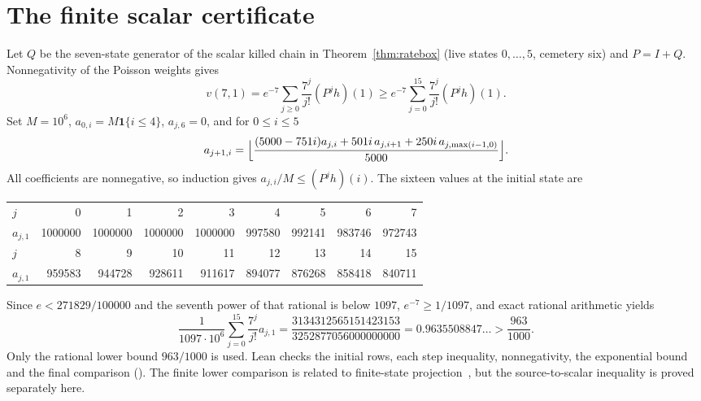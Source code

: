 \documentclass[11pt,a4paper]{article}
\theoremstyle{plain}
\theoremstyle{definition}
\theoremstyle{remark}
\newcommand{\ind}{\mathbf 1}
\begin{document}
\section{The finite scalar certificate}\label{app:scalar}
Let $Q$ be the seven-state generator of the scalar killed chain in Theorem~\ref{thm:ratebox} (live states $0,\dots,5$, cemetery six) and $P=I+Q$. Nonnegativity of the Poisson weights gives
\[
v(7,1)=e^{-7}\sum_{j\ge0}\frac{7^j}{j!}(P^jh)(1)\ge e^{-7}\sum_{j=0}^{15}\frac{7^j}{j!}(P^jh)(1).
\]
Set $M=10^6$, $a_{0,i}=M\ind\{i\le4\}$, $a_{j,6}=0$, and for $0\le i\le5$
\begin{equation}\label{eq:rows}
a_{j+1,i}=\Bigl\lfloor\frac{(5000-751i)a_{j,i}+501i\,a_{j,i+1}+250i\,a_{j,\max(i-1,0)}}{5000}\Bigr\rfloor .
\end{equation}
All coefficients are nonnegative, so induction gives $a_{j,i}/M\le(P^jh)(i)$. The sixteen values at the initial state are
\begin{center}\small
\begin{tabular}{@{}lrrrrrrrr@{}}
\toprule
$j$ & 0 & 1 & 2 & 3 & 4 & 5 & 6 & 7\\
$a_{j,1}$ & 1000000 & 1000000 & 1000000 & 1000000 & 997580 & 992141 & 983746 & 972743\\
\midrule
$j$ & 8 & 9 & 10 & 11 & 12 & 13 & 14 & 15\\
$a_{j,1}$ & 959583 & 944728 & 928611 & 911617 & 894077 & 876268 & 858418 & 840711\\
\bottomrule
\end{tabular}
\end{center}
Since $e<271829/100000$ and the seventh power of that rational is below $1097$, $e^{-7}\ge1/1097$, and exact rational arithmetic yields
\[
\frac1{1097\cdot10^6}\sum_{j=0}^{15}\frac{7^j}{j!}a_{j,1}=\frac{3134312565151423153}{3252877056000000000}=0.9635508847\ldots>\frac{963}{1000}.
\]
Only the rational lower bound $963/1000$ is used. Lean checks the initial rows, each step inequality, nonnegativity, the exponential bound and the final comparison (). The finite lower comparison is related to finite-state projection~\citep{munsky2006}, but the source-to-scalar inequality is proved separately here.
\end{document}
